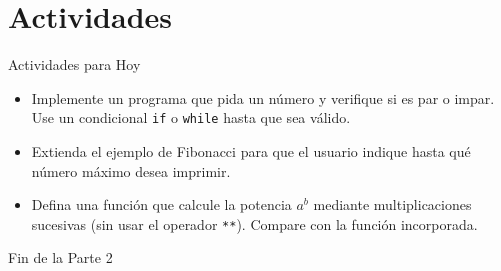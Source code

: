 \documentclass[10pt]{beamer}
\begin{document}
\section{Actividades}
\begin{frame}{Actividades para Hoy}
\begin{itemize}
	\item Implemente un programa que pida un número y verifique si es par o impar.  
	      Use un condicional \texttt{if} o \texttt{while} hasta que sea válido.  
	\item Extienda el ejemplo de Fibonacci para que el usuario indique hasta qué número máximo desea imprimir.  
	\item Defina una función que calcule la potencia \(a^b\) mediante multiplicaciones sucesivas (sin usar el operador \texttt{**}). Compare con la función incorporada.
\end{itemize}
\end{frame}

\begin{frame}
\Huge{\centerline{Fin de la Parte 2}}
\end{frame}
\end{document}
